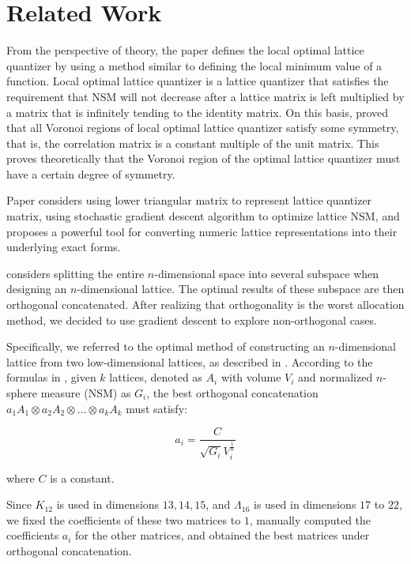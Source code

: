 \section{Related Work}
From the perspective of theory, the paper \cite{best} defines the local optimal lattice quantizer by using a method similar to defining the local minimum value of a function. Local optimal lattice quantizer is a lattice quantizer that satisfies the requirement that NSM will not decrease after a lattice matrix is left multiplied by a matrix that is infinitely tending to the identity matrix. On this basis, \cite{best} proved that all Voronoi regions of local optimal lattice quantizer satisfy some symmetry, that is, the correlation matrix is a constant multiple of the unit matrix. This proves theoretically that the Voronoi region of the optimal lattice quantizer must have a certain degree of symmetry.

Paper \cite{optimization} considers using lower triangular matrix to represent lattice quantizer matrix, using stochastic gradient descent algorithm to optimize lattice NSM, and proposes a powerful tool for converting numeric lattice representations into their underlying exact forms.

\cite{best} considers splitting the entire $n$-dimensional space into several subspace when designing an $n$-dimensional lattice. The optimal results of these subspace are then orthogonal concatenated. After realizing that orthogonality is the worst allocation method, we decided to use gradient descent to explore non-orthogonal cases.

Specifically, we referred to the optimal method of constructing an $n$-dimensional lattice from two low-dimensional lattices, as described in \cite{best}. According to the formulas in \cite{best}, given $k$ lattices, denoted as $A_i$ with volume $V_i$ and normalized $n$-sphere measure (NSM) as $G_i$, the best orthogonal concatenation $a_1A_1 \otimes a_2A_2 \otimes \dots \otimes a_kA_k$ must satisfy:

\[
a_i = \frac{C}{\sqrt{G_i}V_i^{\frac{1}{n}}}
\]

where $C$ is a constant.

Since $K_{12}$ is used in dimensions $13, 14, 15$, and $\Lambda_{16}$ is used in dimensions $17$ to $22$, we fixed the coefficients of these two matrices to $1$, manually computed the coefficients $a_i$ for the other matrices, and obtained the best matrices under orthogonal concatenation.